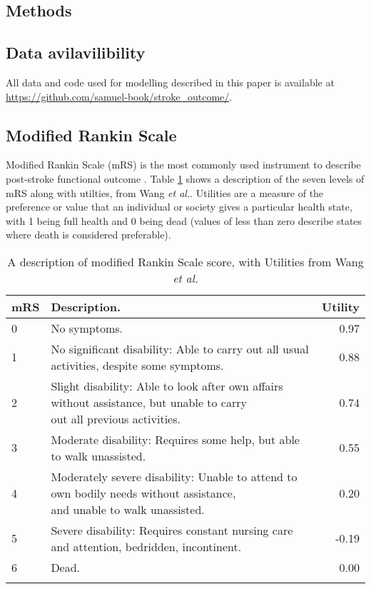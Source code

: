 \begin{multicols}{2}
\section{Methods}

\subsection{Data avilavilibility}

All data and code used for modelling described in this paper is available at \url{https://github.com/samuel-book/stroke_outcome/}.

\subsection{Modified Rankin Scale}

Modified Rankin Scale (mRS) is the most commonly used instrument to describe post-stroke functional outcome \cite{quinn_functional_2009}. Table \ref{tab:mrs} shows a description of the seven levels of mRS along with utilties, from Wang \emph{et al.}\cite{wang_utility-weighted_2020}. Utilities are a measure of the preference or value that an individual or society gives a particular health state, with 1 being full health and 0 being dead (values of less than zero describe states where death is considered preferable).

\end{multicols}


\renewcommand*{\arraystretch}{1.5} %
\begin{longtable}[]{@{}llr@{}}
\caption{A description of modified Rankin Scale score, with Utilities from Wang \emph{et al.}\cite{wang_utility-weighted_2020}}\\
\toprule
mRS & Description. & Utility\tabularnewline
\midrule
\endhead
0 & No symptoms. & 0.97\tabularnewline
1 & No significant disability: Able to carry out all usual activities,
despite some symptoms. & 0.88\tabularnewline
2 & \makecell[l]{Slight disability: Able to look after own affairs without assistance, but unable to carry \\ out all previous activities.} &
0.74\tabularnewline
3 & Moderate disability: Requires some help, but able to walk
unassisted. & 0.55\tabularnewline
4 & \makecell[l]{Moderately severe disability: Unable to attend to own bodily needs without assistance, \\ and unable to walk unassisted.} & 0.20\tabularnewline
5 & Severe disability: Requires constant nursing care and attention,
bedridden, incontinent. & -0.19\tabularnewline
6 & Dead. & 0.00\tabularnewline
\bottomrule
\label{tab:mrs}
\end{longtable}



